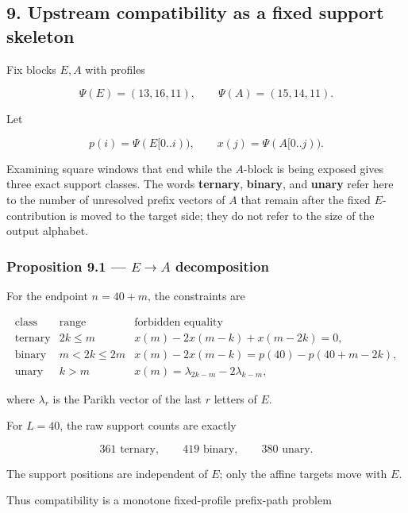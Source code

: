 \documentclass[
  british,
  a4paper,
  11pt]{article}
\begin{document}
\subsection{9. Upstream compatibility as a fixed support
skeleton}\label{upstream-compatibility-as-a-fixed-support-skeleton}

Fix blocks \(E,A\) with profiles

\[
\Psi(E)=(13,16,11),
\qquad
\Psi(A)=(15,14,11).
\]

Let

\[
p(i)=\Psi(E[0..i)),
\qquad
x(j)=\Psi(A[0..j)).
\]

Examining square windows that end while the \(A\)-block is being exposed
gives three exact support classes. The words \textbf{ternary},
\textbf{binary}, and \textbf{unary} refer here to the number of
unresolved prefix vectors of \(A\) that remain after the fixed
\(E\)-contribution is moved to the target side; they do not refer to the
size of the output alphabet.

\subsubsection{\texorpdfstring{Proposition 9.1 --- \(E\to A\)
decomposition}{Proposition 9.1 --- E\textbackslash to A decomposition}}\label{proposition-9.1-eto-a-decomposition}

For the endpoint \(n=40+m\), the constraints are

\[
\begin{array}{c|c|c}
\text{class}&\text{range}&\text{forbidden equality}\\
\hline
\text{ternary}&2k\le m&
x(m)-2x(m-k)+x(m-2k)=0,\\[1mm]
\text{binary}&m<2k\le2m&
x(m)-2x(m-k)=p(40)-p(40+m-2k),\\[1mm]
\text{unary}&k>m&
x(m)=\lambda_{2k-m}-2\lambda_{k-m},
\end{array}
\tag{9.1}
\]

where \(\lambda_r\) is the Parikh vector of the last \(r\) letters of
\(E\).

For \(L=40\), the raw support counts are exactly

\[
\boxed{
361\text{ ternary},
\qquad
419\text{ binary},
\qquad
380\text{ unary}.
}
\tag{9.2}
\]

The support positions are independent of \(E\); only the affine targets
move with \(E\).

Thus compatibility is a monotone fixed-profile prefix-path problem
\end{document}
